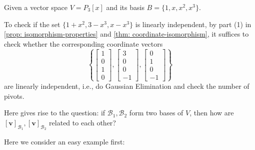 \begin{example}\label{ex:coordinate_change}
Given a vector space \(V = P_3[x]\) and its basis \(B = \{1, x, x^2, x^3\}\).

To check if the set \(\{1 + x^2, 3 - x^3, x - x^3\}\) is linearly independent, by part (1) in \autoref{prop: isomorphism-properties} and \autoref{thm: coordinate-isomorphism}, it suffices to check whether the corresponding coordinate vectors
\[
\left\{
\begin{bmatrix}
1 \\ 0 \\ 1 \\ 0
\end{bmatrix},
\begin{bmatrix}
3 \\ 0 \\ 0 \\ -1
\end{bmatrix},
\begin{bmatrix}
0 \\ 1 \\ 0 \\ -1
\end{bmatrix}
\right\}
\]
are linearly independent, i.e., do Gaussian Elimination and check the number of pivots.
\end{example}

\begin{remark}
Here gives rise to the question: if \(\mathcal{B}_1, \mathcal{B}_2\) form two bases of \(V\), then how are \([\mathbf{v}]_{\mathcal{B}_1}, [\mathbf{v}]_{\mathcal{B}_2}\) related to each other?

Here we consider an easy example first:
\end{remark}

